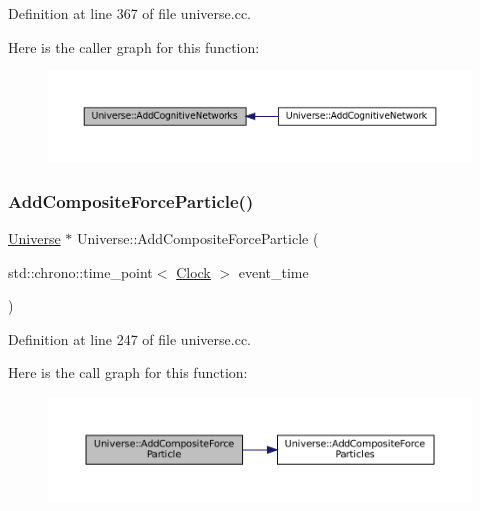 Definition at line 367 of file universe.\+cc.

Here is the caller graph for this function\+:\nopagebreak
\begin{figure}[H]
\begin{center}
\leavevmode
\includegraphics[width=350pt]{class_universe_a5199f6c27b1a97c8b8c9847b8be686cf_icgraph}
\end{center}
\end{figure}
\mbox{\label{class_universe_ab2671c2218c98f0f1f487c5b3bb96e3c}} 
\subsubsection{\texorpdfstring{Add\+Composite\+Force\+Particle()}{AddCompositeForceParticle()}}
{\footnotesize\ttfamily \mbox{\hyperlink{class_universe}{Universe}} $\ast$ Universe\+::\+Add\+Composite\+Force\+Particle (\begin{DoxyParamCaption}\item[{std\+::chrono\+::time\+\_\+point$<$ \mbox{\hyperlink{universe_8h_a0ef8d951d1ca5ab3cfaf7ab4c7a6fd80}{Clock}} $>$}]{event\+\_\+time }\end{DoxyParamCaption})}



Definition at line 247 of file universe.\+cc.

Here is the call graph for this function\+:\nopagebreak
\begin{figure}[H]
\begin{center}
\leavevmode
\includegraphics[width=350pt]{class_universe_ab2671c2218c98f0f1f487c5b3bb96e3c_cgraph}
\end{center}
\end{figure}
\mbox{\label{class_universe_a23d74e377203fca7cb74e0ffee7244b6}} 
